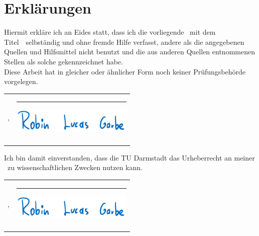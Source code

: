 \hfill
\section*{Erklärungen}
\noindent
Hiermit erkläre ich an Eides statt, dass ich die vorliegende \TUTyp\ mit dem Titel\ \glqq\TUTitel\grqq\ selb\-ständig und ohne fremde Hilfe verfasst, andere als die angegebenen Quellen und Hilfsmittel nicht benutzt und die aus anderen	Quellen entnommenen Stellen als solche gekennzeichnet habe.\\
Diese Arbeit hat in gleicher oder ähnlicher Form noch keiner Prüfungsbehörde vorgelegen.\vspace*{18mm} \\
\noindent
\begin{tabular}{ll}
	\TUStadt, \TUAbgabe	\hspace{1cm}	& \rule{0.4\textwidth}{0.4pt} \hspace{-64mm}\includegraphics[width=58mm]{images/01/Signatur.png}\\
									& \TUAutor
\end{tabular}

\vspace{20mm}
\noindent
Ich bin damit einverstanden, dass die TU Darmstadt das Urheberrecht an meiner \TUTyp\ zu wissenschaftlichen Zwecken nutzen kann.\vspace*{10mm} \\
\noindent

\begin{tabular}{ll}
	\TUStadt, \TUAbgabe	\hspace{1cm}	& \rule{0.4\textwidth}{0.4pt} \hspace{-64mm}\includegraphics[width=58mm]{images/01/Signatur.png}\\
									& \TUAutor
\end{tabular}
